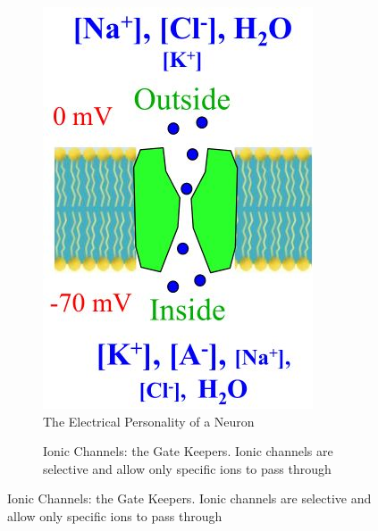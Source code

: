 \documentclass[]{article}
\begin{document}
\begin{figure}[H]
\begin{subfigure}[t]{0.45\textwidth}
\begin{center}
		\end{center}
	\end{subfigure}
	\begin{subfigure}[t]{0.45\textwidth}
		\begin{center}
			\caption{The Electrical Personality of a Neuron}\label{fig:what:is:a:neuron2}
			\includegraphics[width=\textwidth]{what-is-a-neuron2}
		\end{center}
	\end{subfigure}
	\begin{subfigure}[t]{0.45\textwidth}
		\caption{Ionic Channels: the Gate Keepers.  Ionic channels  are selective and	allow only specific ions to pass through}\label{fig:ionic-channel}

\end{subfigure}
\end{figure}
\end{document}
